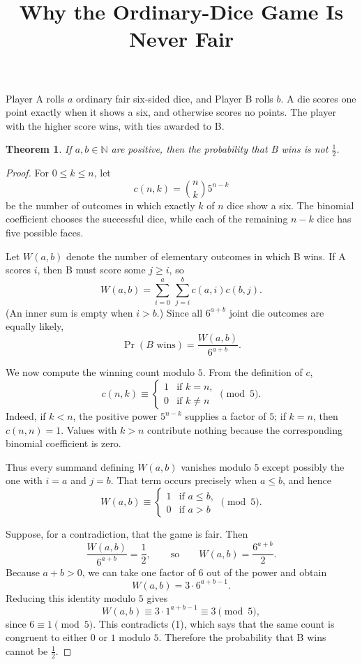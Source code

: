 \documentclass[11pt]{article}
\title{Why the Ordinary-Dice Game Is Never Fair}
\author{}
\date{}
\newtheorem{theorem}{Theorem}
\newcommand{\N}{\mathbb{N}}
\begin{document}
\maketitle

Player A rolls $a$ ordinary fair six-sided dice, and Player B rolls $b$.
A die scores one point exactly when it shows a six, and otherwise scores no
points.  The player with the higher score wins, with ties awarded to B.

\begin{theorem}
If $a,b\in\N$ are positive, then the probability that B wins is not
$\tfrac12$.
\end{theorem}

\begin{proof}
For $0\leq k\leq n$, let
\[
  c(n,k)=\binom{n}{k}5^{n-k}
\]
be the number of outcomes in which exactly $k$ of $n$ dice show a six.  The
binomial coefficient chooses the successful dice, while each of the remaining
$n-k$ dice has five possible faces.

Let $W(a,b)$ denote the number of elementary outcomes in which B wins.  If A
scores $i$, then B must score some $j\geq i$, so
\[
  W(a,b)
    =\sum_{i=0}^{a}\ \sum_{j=i}^{b} c(a,i)c(b,j).
\]
(An inner sum is empty when $i>b$.)  Since all $6^{a+b}$ joint die outcomes
are equally likely,
\[
  \Pr(B\text{ wins})=\frac{W(a,b)}{6^{a+b}}.
\]

We now compute the winning count modulo $5$.  From the definition of $c$,
\[
  c(n,k)\equiv
  \begin{cases}
    1 & \text{if }k=n,\\
    0 & \text{if }k\neq n
  \end{cases}
  \pmod 5.
\]
Indeed, if $k<n$, the positive power $5^{n-k}$ supplies a factor of $5$; if
$k=n$, then $c(n,n)=1$.  Values with $k>n$ contribute nothing because the
corresponding binomial coefficient is zero.

Thus every summand defining $W(a,b)$ vanishes modulo $5$ except possibly the
one with $i=a$ and $j=b$.  That term occurs precisely when $a\leq b$, and
hence
\[
  W(a,b)\equiv
  \begin{cases}
    1 & \text{if }a\leq b,\\
    0 & \text{if }a>b
  \end{cases}
  \pmod 5.                                      \tag{1}
\]

Suppose, for a contradiction, that the game is fair.  Then
\[
  \frac{W(a,b)}{6^{a+b}}=\frac12,
  \qquad\text{so}\qquad
  W(a,b)=\frac{6^{a+b}}2.
\]
Because $a+b>0$, we can take one factor of $6$ out of the power and obtain
\[
  W(a,b)=3\cdot 6^{a+b-1}.
\]
Reducing this identity modulo $5$ gives
\[
  W(a,b)\equiv 3\cdot 1^{a+b-1}\equiv 3\pmod 5,
\]
since $6\equiv1\pmod5$.  This contradicts (1), which says that the same count
is congruent to either $0$ or $1$ modulo $5$.  Therefore the probability that
B wins cannot be $\tfrac12$.
\end{proof}
\end{document}
